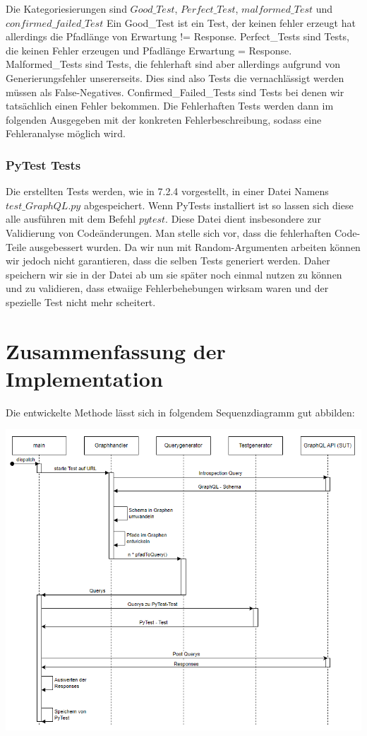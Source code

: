 Die Kategoriesierungen sind $Good\_Test$, $Perfect\_Test$, $malformed\_Test$ und $confirmed\_failed\_Test$
Ein Good\_Test ist ein Test, der keinen fehler erzeugt hat allerdings die Pfadlänge von Erwartung != Response.
Perfect\_Tests sind Tests, die keinen Fehler erzeugen und Pfadlänge Erwartung = Response.
Malformed\_Tests sind Tests, die fehlerhaft sind aber allerdings aufgrund von Generierungsfehler unsererseits.
Dies sind also Tests die vernachlässigt werden müssen als False-Negatives.
Confirmed\_Failed\_Tests sind Tests bei denen wir tatsächlich einen Fehler bekommen.
Die Fehlerhaften Tests werden dann im folgenden Ausgegeben mit der konkreten Fehlerbeschreibung, sodass eine
Fehleranalyse möglich wird.


\subsubsection{PyTest Tests}

Die erstellten Tests werden, wie in 7.2.4 vorgestellt, in einer Datei Namens $test\_GraphQL.py$ abgespeichert.
Wenn PyTests installiert ist so lassen sich diese alle ausführen mit dem Befehl $pytest$.
Diese Datei dient insbesondere zur Validierung von Codeänderungen.
Man stelle sich vor, dass die fehlerhaften Code-Teile ausgebessert wurden.
Da wir nun mit Random-Argumenten arbeiten können wir jedoch nicht garantieren, dass die selben Tests generiert werden.
Daher speichern wir sie in der Datei ab um sie später noch einmal nutzen zu können und zu validieren, dass etwaiige Fehlerbehebungen wirksam waren und
der spezielle Test nicht mehr scheitert.

\newpage
\section{Zusammenfassung der Implementation}

Die entwickelte Methode lässt sich in folgendem Sequenzdiagramm gut abbilden:

\begin{center}
    \includegraphics[width=\textwidth,height=\textheight,keepaspectratio]{img/sequenz}
\end{center}

